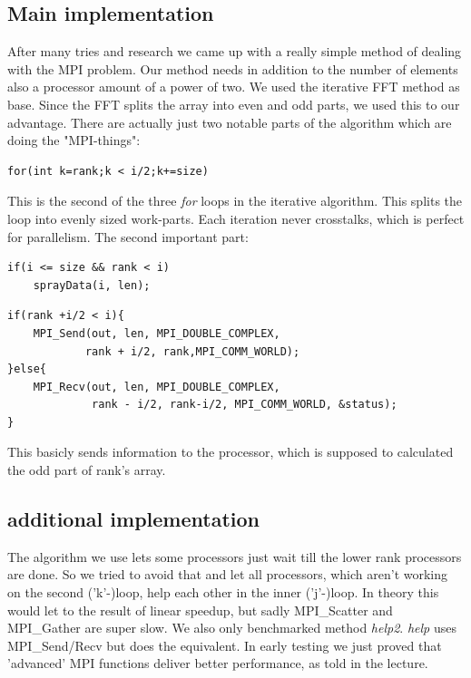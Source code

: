 \subsection{Main implementation}
After many tries and research we came up with a really simple method of dealing with the MPI problem. Our method needs in addition to the number of elements also a processor amount of a power of two. We used the iterative FFT method as base. Since the FFT splits the array into even and odd parts, we used this to our advantage. There are actually just two notable parts of the algorithm which are doing the "MPI-things":
\begin{lstlisting}
for(int k=rank;k < i/2;k+=size)
\end{lstlisting}
This is the second of the three \textit{for} loops in the iterative algorithm. This splits the loop into evenly sized work-parts. Each iteration never crosstalks, which is perfect for parallelism.\newline
The second important part:
\begin{lstlisting}
if(i <= size && rank < i)
	sprayData(i, len);
\end{lstlisting}
\begin{lstlisting}
if(rank +i/2 < i){
	MPI_Send(out, len, MPI_DOUBLE_COMPLEX,
			rank + i/2, rank,MPI_COMM_WORLD);
}else{
	MPI_Recv(out, len, MPI_DOUBLE_COMPLEX,
			 rank - i/2, rank-i/2, MPI_COMM_WORLD, &status);
}
\end{lstlisting}
This basicly sends information to the processor, which is supposed to calculated the odd part of rank's array. 

\subsection{additional implementation}
The algorithm we use lets some processors just wait till the lower rank processors are done. So we tried to avoid that and let all processors, which aren't working on the second ('k'-)loop, help each other in the inner ('j'-)loop. In theory this would let to the result of linear speedup, but sadly MPI\_Scatter and MPI\_Gather are super slow. We also only benchmarked method \textit{help2}. \textit{help} uses MPI\_Send/Recv but does the equivalent. In early testing we just proved that 'advanced' MPI functions deliver better performance, as told in the lecture.

